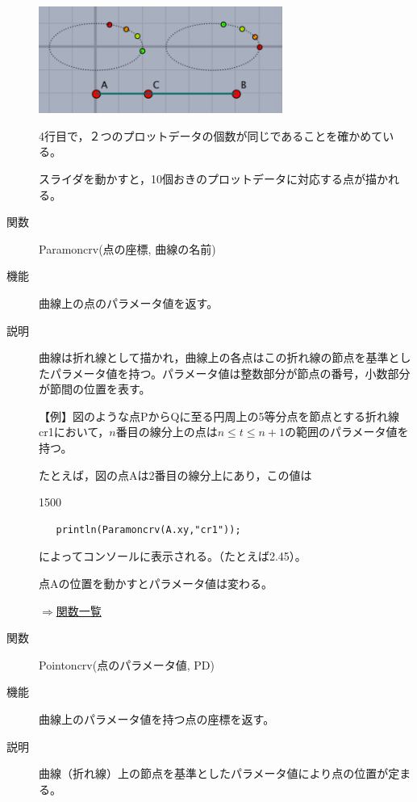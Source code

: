 \documentclass[papersize,a4paper,12pt,uplatex]{jsarticle}
\begin{document}
\begin{description}
\begin{center}
\includegraphics[bb=0.00 0.00 305.02 133.01,width=8cm]{Fig/numptcrv.pdf}
\end{center}

4行目で，２つのプロットデータの個数が同じであることを確かめている。

スライダを動かすと，10個おきのプロットデータに対応する点が描かれる。

\vspace{\baselineskip}
\hypertarget{paramoncrv}{}
\item[関数]  Paramoncrv(点の座標, 曲線の名前)
\item[機能]  曲線上の点のパラメータ値を返す。
\item[説明]  曲線は折れ線として描かれ，曲線上の各点はこの折れ線の節点を基準としたパラメータ値を持つ。パラメータ値は整数部分が節点の番号，小数部分が節間の位置を表す。

\vspace{\baselineskip}
【例】図のような点PからQに至る円周上の5等分点を節点とする折れ線cr1において，$n$番目の線分上の点は$n\leq t\leq n+1$の範囲のパラメータ値を持つ。

たとえば，図の点$\mathrm{A}$は2番目の線分上にあり，この値は

\begin{layer}{150}{0}
\end{layer}

\begin{verbatim}
   println(Paramoncrv(A.xy,"cr1"));
\end{verbatim}  
    
によってコンソールに表示される。（たとえば2.45）。

点Aの位置を動かすとパラメータ値は変わる。

\vspace{20mm}
\begin{flushright}  \hyperlink{functionlist}{$\Rightarrow$関数一覧}\end{flushright}


\vspace{\baselineskip}
\hypertarget{pointoncrv}{}
\item[関数]  Pointoncrv(点のパラメータ値, PD)
\item[機能]  曲線上のパラメータ値を持つ点の座標を返す。
\item[説明]  曲線（折れ線）上の節点を基準としたパラメータ値により点の位置が定まる。


\end{description}
\end{document}
